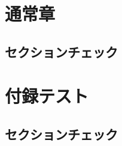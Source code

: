 \documentclass[11pt,a4paper,openright]{ltjsbook}
\begin{document}
\tableofcontents

\chapter{通常章}

\lipsum

\section{セクションチェック}

\lipsum

\lipsum

\appendix
\chapter{付録テスト}

\lipsum

\section{セクションチェック}

\lipsum

\lipsum
\end{document}
